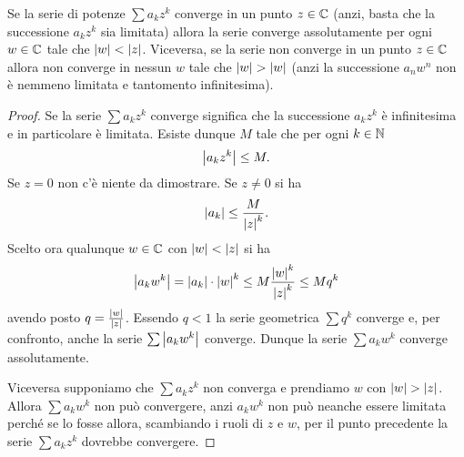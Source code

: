 \begin{theorem}
\mymark{***}
Se la serie di potenze $\sum a_k z^k$ converge in un punto $z\in {\mathbb C}$
(anzi, basta che la successione $a_k z^k$ sia limitata)
allora la serie
converge assolutamente per ogni $w\in {\mathbb C}$ tale che ${\left|w\right|}< {\left|z\right|}$.
Viceversa, se la serie non converge in un punto $z\in {\mathbb C}$
allora
non  converge in nessun $w$ tale che ${\left|w\right|} > {\left|w\right|}$ (anzi la successione
$a_n w^n$ non è nemmeno limitata e tantomento infinitesima).
\end{theorem}
%
\begin{proof}
\mymark{*}
Se la serie $\sum a_k z^k$ converge significa che la successione
$a_k z^k$ è infinitesima e in particolare è limitata.
Esiste dunque $M$ tale che per ogni $k\in {\mathbb N}$
\[
 {\left|a_k z^k\right|} \le M.
\]
Se $z=0$ non c'è niente da dimostrare.
Se $z\neq 0$ si ha
\[
 {\left|a_k\right|} \le \frac{M}{{\left|z\right|}^k}.
\]
Scelto ora qualunque $w\in {\mathbb C}$ con ${\left|w\right|} < {\left|z\right|}$ si ha
\[
  {\left|a_k w^k\right|} = {\left|a_k\right|}\cdot {\left|w\right|}^k \le M \frac{{\left|w\right|}^k}{{\left|z\right|}^k}
  \le M q^k
\]
avendo posto $q = \frac{{\left|w\right|}}{{\left|z\right|}}$.
Essendo $q<1$ la serie geometrica $\sum q^k$ converge e, per confronto,
anche la serie $\sum {\left|a_k w^k\right|}$ converge.
Dunque la serie $\sum a_k w^k$ converge assolutamente.

Viceversa supponiamo che $\sum a_k z^k$ non converga
e prendiamo $w$ con ${\left|w\right|} > {\left|z\right|}$.
Allora $\sum a_k w^k$ non può convergere,
anzi $a_k w^k$ non può neanche essere limitata perché
se lo fosse allora, scambiando i ruoli di $z$ e $w$,
per il punto precedente la serie $\sum a_k z^k$ dovrebbe convergere.
\end{proof}

